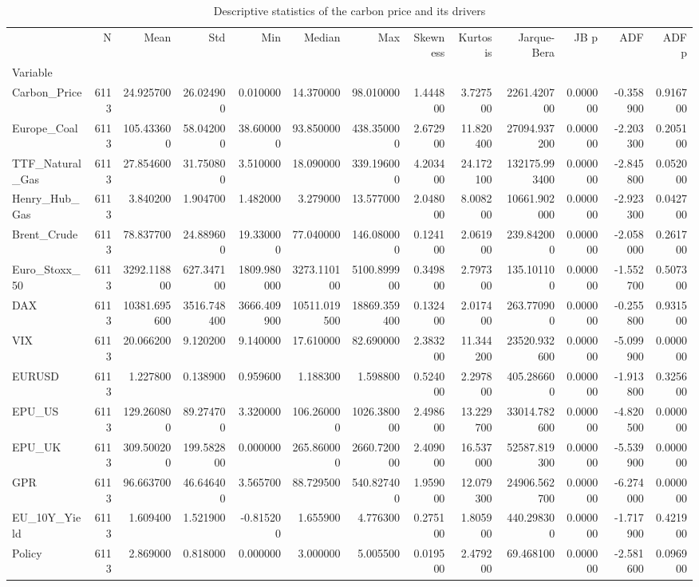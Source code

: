 \begin{table}[htbp]
\caption{Descriptive statistics of the carbon price and its drivers}
\label{tab:descriptives}
\begin{tabular}{lrrrrrrrrrrrr}
\toprule
 & N & Mean & Std & Min & Median & Max & Skewness & Kurtosis & Jarque-Bera & JB p & ADF & ADF p \\
Variable &  &  &  &  &  &  &  &  &  &  &  &  \\
\midrule
Carbon_Price & 6113 & 24.925700 & 26.024900 & 0.010000 & 14.370000 & 98.010000 & 1.444800 & 3.727500 & 2261.420700 & 0.000000 & -0.358900 & 0.916700 \\
Europe_Coal & 6113 & 105.433600 & 58.042000 & 38.600000 & 93.850000 & 438.350000 & 2.672900 & 11.820400 & 27094.937200 & 0.000000 & -2.203300 & 0.205100 \\
TTF_Natural_Gas & 6113 & 27.854600 & 31.750800 & 3.510000 & 18.090000 & 339.196000 & 4.203400 & 24.172100 & 132175.993400 & 0.000000 & -2.845800 & 0.052000 \\
Henry_Hub_Gas & 6113 & 3.840200 & 1.904700 & 1.482000 & 3.279000 & 13.577000 & 2.048000 & 8.008200 & 10661.902000 & 0.000000 & -2.923300 & 0.042700 \\
Brent_Crude & 6113 & 78.837700 & 24.889600 & 19.330000 & 77.040000 & 146.080000 & 0.124100 & 2.061900 & 239.842000 & 0.000000 & -2.058000 & 0.261700 \\
Euro_Stoxx_50 & 6113 & 3292.118800 & 627.347100 & 1809.980000 & 3273.110100 & 5100.899900 & 0.349800 & 2.797300 & 135.101100 & 0.000000 & -1.552700 & 0.507300 \\
DAX & 6113 & 10381.695600 & 3516.748400 & 3666.409900 & 10511.019500 & 18869.359400 & 0.132400 & 2.017400 & 263.770900 & 0.000000 & -0.255800 & 0.931500 \\
VIX & 6113 & 20.066200 & 9.120200 & 9.140000 & 17.610000 & 82.690000 & 2.383200 & 11.344200 & 23520.932600 & 0.000000 & -5.099900 & 0.000000 \\
EURUSD & 6113 & 1.227800 & 0.138900 & 0.959600 & 1.188300 & 1.598800 & 0.524000 & 2.297800 & 405.286600 & 0.000000 & -1.913800 & 0.325600 \\
EPU_US & 6113 & 129.260800 & 89.274700 & 3.320000 & 106.260000 & 1026.380000 & 2.498600 & 13.229700 & 33014.782600 & 0.000000 & -4.820500 & 0.000000 \\
EPU_UK & 6113 & 309.500200 & 199.582800 & 0.000000 & 265.860000 & 2660.720000 & 2.409000 & 16.537000 & 52587.819300 & 0.000000 & -5.539900 & 0.000000 \\
GPR & 6113 & 96.663700 & 46.646400 & 3.565700 & 88.729500 & 540.827400 & 1.959000 & 12.079300 & 24906.562700 & 0.000000 & -6.274000 & 0.000000 \\
EU_10Y_Yield & 6113 & 1.609400 & 1.521900 & -0.815200 & 1.655900 & 4.776300 & 0.275100 & 1.805900 & 440.298300 & 0.000000 & -1.717900 & 0.421900 \\
Policy & 6113 & 2.869000 & 0.818000 & 0.000000 & 3.000000 & 5.005500 & 0.019500 & 2.479200 & 69.468100 & 0.000000 & -2.581600 & 0.096900 \\
\bottomrule
\end{tabular}
\end{table}
